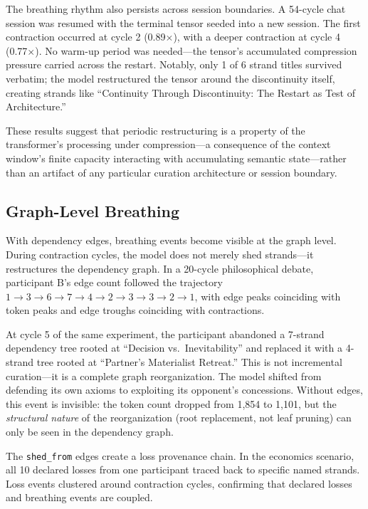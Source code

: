 The breathing rhythm also persists across session boundaries. A 54-cycle
chat session was resumed with the terminal tensor seeded into a new session.
The first contraction occurred at cycle 2 (0.89$\times$), with a deeper
contraction at cycle 4 (0.77$\times$). No warm-up period was needed---the
tensor's accumulated compression pressure carried across the restart.
Notably, only 1 of 6 strand titles survived verbatim; the model restructured
the tensor around the discontinuity itself, creating strands like
``Continuity Through Discontinuity: The Restart as Test of Architecture.''

These results suggest that periodic restructuring is a property of the
transformer's processing under compression---a consequence of the context
window's finite capacity interacting with accumulating semantic state---rather
than an artifact of any particular curation architecture or session boundary.

\subsection{Graph-Level Breathing}
\label{sec:graph-breathing}

With dependency edges, breathing events become visible at the graph level.
During contraction cycles, the model does not merely shed strands---it
restructures the dependency graph. In a 20-cycle philosophical debate,
participant B's edge count followed the trajectory
$1 \rightarrow 3 \rightarrow 6 \rightarrow 7 \rightarrow 4 \rightarrow
2 \rightarrow 3 \rightarrow 3 \rightarrow 2 \rightarrow 1$, with edge
peaks coinciding with token peaks and edge troughs coinciding with
contractions.

At cycle 5 of the same experiment, the participant abandoned a 7-strand
dependency tree rooted at ``Decision vs.\ Inevitability'' and replaced it
with a 4-strand tree rooted at ``Partner's Materialist Retreat.'' This is
not incremental curation---it is a complete graph reorganization. The model
shifted from defending its own axioms to exploiting its opponent's
concessions. Without edges, this event is invisible: the token count
dropped from 1,854 to 1,101, but the \emph{structural nature} of the
reorganization (root replacement, not leaf pruning) can only be seen in
the dependency graph.

The \texttt{shed\_from} edges create a loss provenance chain. In the
economics scenario, all 10 declared losses from one participant traced
back to specific named strands. Loss events clustered around contraction
cycles, confirming that declared losses and breathing events are coupled.


